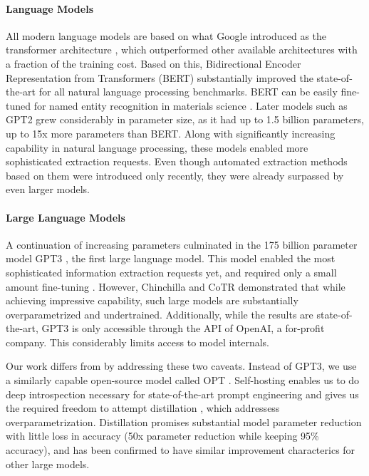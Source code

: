 \documentclass[a4paper,11pt]{article}
\begin{document}
\paragraph{Language Models}
All modern language models are based on what Google introduced as the
transformer architecture \cite{vaswani_attention_2017}, which outperformed
other available architectures with a fraction of the training cost. Based on
this, Bidirectional Encoder Representation from Transformers (BERT)
\cite{devlin_bert_2018} substantially improved the state-of-the-art for all
natural language processing benchmarks. BERT can be easily fine-tuned for named
entity recognition in materials science \cite{zhao_finetuning_2021b}. Later
models such as GPT2 \cite{radford_language_2019} grew considerably in parameter
size, as it had up to 1.5 billion parameters, up to 15x more parameters than
BERT. Along with significantly increasing capability in natural language
processing, these models enabled more sophisticated extraction requests.
Even though automated extraction methods based on them were introduced only
recently, they were already surpassed by even larger models.

\paragraph{Large Language Models}
A continuation of increasing parameters culminated in the 175 billion parameter
model GPT3 \cite{brown_language_2020}, the first large language model. This
model enabled the most sophisticated information extraction requests yet, and
required only a small amount fine-tuning \cite{dunn_structured_2022}. However,
Chinchilla \cite{hoffmann_training_2022} and CoTR \cite{zhang_multimodal_2023}
demonstrated that while achieving impressive capability, such large models are
substantially overparametrized and undertrained. Additionally, while the
results are state-of-the-art, GPT3 is only accessible through the API of
OpenAI, a for-profit company. This considerably limits access to model
internals.

Our work differs from \cite{dunn_structured_2022} by addressing these two
caveats. Instead of GPT3, we use a similarly capable open-source model called
OPT \cite{zhang_opt_2022}. Self-hosting enables us to do deep introspection
necessary for state-of-the-art prompt engineering and gives us the required
freedom to attempt distillation \cite{sun_patient_2019}, which addressess
overparametrization. Distillation promises substantial model parameter
reduction with little loss in accuracy (50x parameter reduction while keeping
95\% accuracy), and has been confirmed to have similar improvement characterics
for other large models.
\end{document}
